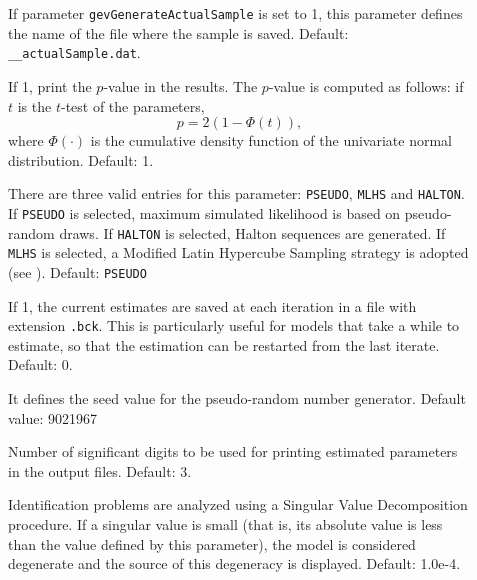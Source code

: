 \documentclass[12pt]{memoir}
\begin{document}
\begin{description}
\begin{description}
\item[] If parameter
  \verb+gevGenerateActualSample+ is set to 1, this parameter defines
  the name of the file where the sample is saved. Default: \verb+__actualSample.dat+.

\item[] If 1, print the $p$-value in the results. The $p$-value is computed as follows: if $t$ is the $t$-test of the parameters, 
\begin{equation}
p = 2 (1 - \Phi(t)),
\end{equation}
where $\Phi(\cdot)$ is the cumulative density function of the univariate normal distribution.
Default: 1.

      \item[] There are three valid entries for this parameter: \newline \verb+PSEUDO+, \verb+MLHS+ and \verb+HALTON+. If \verb+PSEUDO+ is selected, maximum simulated likelihood 
         is based on pseudo-random draws. If \verb+HALTON+ is selected, Halton sequences are generated. If \verb+MLHS+ is selected, a Modified Latin Hypercube Sampling strategy is adopted (see \cite{HessTraiPola05}). 
         Default: \verb+PSEUDO+


\item[] If 1, the current estimates are saved at each iteration in a file with extension \texttt{.bck}. This is particularly useful for models that take a while to estimate, so that the estimation can be restarted from the last iterate. Default: 0. 


      \item[] It defines the seed value for the
         pseudo-random number generator. Default value: 9021967

\item[] Number of significant digits to be used for printing estimated parameters in the output files. Default: 3.

\item[] Identification problems
  are analyzed using a Singular Value Decomposition procedure. If a
  singular value is small (that is, its absolute value is less than
  the value defined by this parameter), the model is considered
  degenerate and the source of this degeneracy is displayed. Default:
  1.0e-4.


\end{description}
\end{description}
\end{document}
